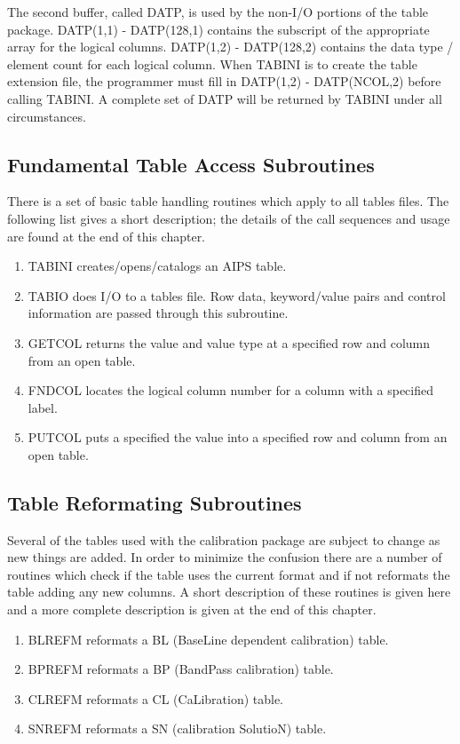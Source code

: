 The second buffer, called DATP, is used by the non-I/O portions of the
table package.  DATP(1,1) - DATP(128,1) contains the subscript of the
appropriate array for the logical columns.  DATP(1,2) - DATP(128,2)
contains the data type / element count for each logical column.  When TABINI is to
create the table extension file, the programmer must fill in DATP(1,2)
- DATP(NCOL,2) before calling TABINI.  A complete set of DATP will be
returned by TABINI under all circumstances.

\subsection{Fundamental Table Access Subroutines }
There is a set of basic table handling routines which apply to all
tables files.  The following list gives a short description; the
details of the call sequences and usage are found at the end of this
chapter.

\begin{enumerate} %
\item TABINI creates/opens/catalogs an AIPS table.
\item TABIO does I/O to a tables file.  Row data,
keyword/value pairs and control information are passed through this
subroutine.
\item GETCOL returns the value and value type at a
specified row and column from an open table.
\item FNDCOL locates the logical column number for a
column with a specified label.
\item PUTCOL puts a specified the value into a specified
row and column from an open table.

\end{enumerate} %
\subsection{Table Reformating Subroutines }
Several of the tables used with the calibration package are subject to
change as new things are added.  In order to minimize the confusion
there are a number of routines which check if the table uses the
current format and if not reformats the table adding any new columns.
A short description of these routines is given here and a more
complete description is given at the end of this chapter.

\begin{enumerate} %
\item BLREFM reformats a BL (BaseLine dependent
calibration) table.
\item BPREFM reformats a BP (BandPass calibration)
table.
\item CLREFM reformats a CL (CaLibration) table.
\item SNREFM reformats a SN (calibration SolutioN)
table.

\end{enumerate} %
